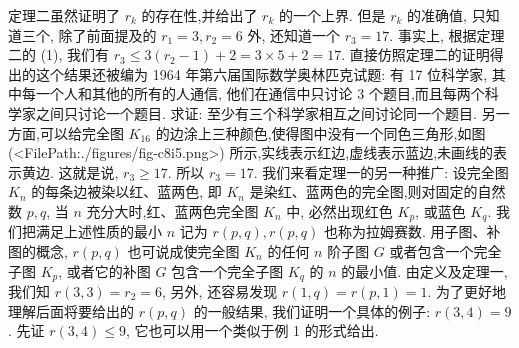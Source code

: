 定理二虽然证明了 $r_k$ 的存在性,并给出了 $r_k$ 的一个上界.
但是 $r_k$ 的准确值, 只知道三个, 除了前面提及的 $r_1=3, r_2=6$ 外, 还知道一个 $r_3=17$. 事实上, 根据定理二的 (1), 我们有 $r_3 \leqslant 3\left(r_2-1\right)+2=3 \times 5+2=17$. 直接仿照定理二的证明得出的这个结果还被编为 1964 年第六届国际数学奥林匹克试题:
有 17 位科学家, 其中每一个人和其他的所有的人通信, 他们在通信中只讨论 3 个题目,而且每两个科学家之间只讨论一个题目.
求证: 至少有三个科学家相互之间讨论同一个题目.
另一方面,可以给完全图 $K_{16}$ 的边涂上三种颜色,使得图中没有一个同色三角形,如图(<FilePath:./figures/fig-c8i5.png>) 所示,实线表示红边,虚线表示蓝边,未画线的表示黄边.
这就是说, $r_3 \geqslant 17$. 所以 $r_3=17$.
我们来看定理一的另一种推广:
设完全图 $K_n$ 的每条边被染以红、蓝两色, 即 $K_n$ 是染红、蓝两色的完全图,则对固定的自然数 $p, q$, 当 $n$ 充分大时,红、蓝两色完全图 $K_n$ 中, 必然出现红色 $K_p$, 或蓝色 $K_q$. 我们把满足上述性质的最小 $n$ 记为 $r(p, q), r(p, q)$ 也称为拉姆赛数.
用子图、补图的概念, $r(p, q)$ 也可说成使完全图 $K_n$ 的任何 $n$ 阶子图 $G$ 或者包含一个完全子图 $K_p$, 或者它的补图 $G$ 包含一个完全子图 $K_q$ 的 $n$ 的最小值.
由定义及定理一, 我们知 $r(3,3)=r_2=6$, 另外, 还容易发现 $r(1, q)= r(p, 1)=1$.
为了更好地理解后面将要给出的 $r(p, q)$ 的一般结果, 我们证明一个具体的例子: $r(3,4)=9$. 先证 $r(3,4) \leqslant 9$, 它也可以用一个类似于例 1 的形式给出.



